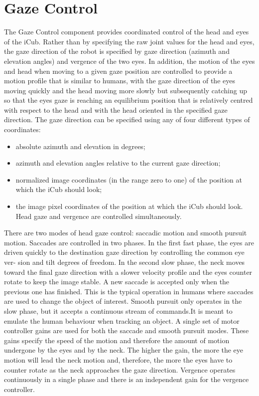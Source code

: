\documentclass[a4paper, 12pt]{report}
\begin{document}
\section{Gaze Control}
The Gaze Control component provides coordinated control of the head and eyes of 
the iCub. Rather than by specifying the raw joint values for the head and eyes, 
the gaze direction of the robot is specified by gaze direction (azimuth and 
elevation angles) and vergence of the two eyes. In addition, the motion of the 
eyes and head when moving to a given gaze position are controlled to provide a 
motion profile that is similar to humans, with the gaze direction of the eyes 
moving quickly and the head moving more slowly but subsequently catching up so 
that the eyes gaze is reaching an equilibrium position that is relatively 
centred with respect to the head  and with the head oriented in the specified 
gaze direction.
\newpage The gaze direction can be specified using any of four different types 
of 
coordinates:
\begin{itemize}
  \item absolute azimuth and elevation  in degrees;
  \item azimuth and elevation angles relative to the current gaze direction;
  \item normalized image coordinates (in the range zero to one) of the position 
  at which the iCub should look;
  \item the image pixel coordinates of the position at which the iCub should 
  look.  Head gaze and vergence are controlled simultaneously.
\end{itemize}
There are two modes of head gaze control: saccadic motion and smooth pursuit
motion. Saccades are controlled in two phases. In the first fast phase, the 
eyes are driven quickly to the destination gaze direction by controlling the 
common eye ver- sion and tilt degrees of freedom. In the second slow phase, the 
neck moves toward the final gaze direction with a slower velocity profile and 
the eyes counter rotate to keep the image stable. A new saccade is accepted 
only when the previous one has finished. This is the typical operation in 
humans where saccades are used to change the object of interest. Smooth 
pursuit only operates in the slow phase, but it accepts a continuous stream 
of commands.\textbf{\cite{cangelosi-action}}It is meant to emulate the human 
behaviour 
when 
tracking an 
object. A single set of motor controller gains are used for both the saccade 
and smooth pursuit modes. These gains specify the speed of the motion and 
therefore the amount of motion undergone by the eyes and by the neck. The 
higher the gain, the more the eye motion will lead the neck motion and, 
therefore, the more the eyes have to counter rotate as the neck approaches the 
gaze direction. Vergence operates continuously in a single phase and there is 
an independent gain for the vergence controller.
\end{document}
